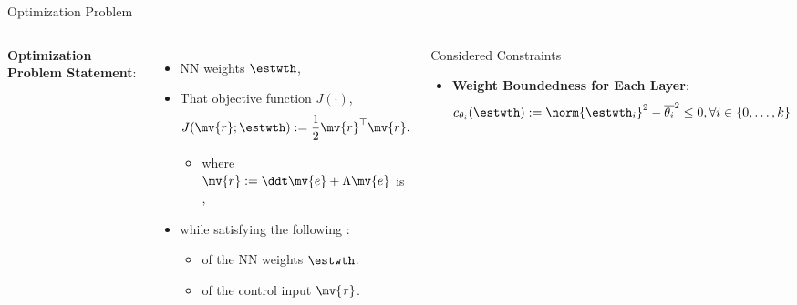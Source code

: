 \documentclass[8pt, aspectratio=169, handout]{beamer}
\newcommand{\ctxt}[2]{\color{#1}{#2}\color{black}}
\begin{document}
\begin{frame}{\insertsubsectionhead}{Optimization Problem}

\begin{columns}


    \textbf{Optimization Problem Statement}:

    \begin{itemize}
      \item \ctxt{awesome}{Find } NN weights $\estwth$,
      \item That \ctxt{airforceblue}{minimize } objective function $J(\cdot)$,
        \begin{equation}\label{eq:obj}
          J(\mv{r};\estwth)
          := 
          \frac{1}{2} \mv{r}^\top \mv{r}.
        \end{equation}
        \begin{itemize}
          \item where $\mv{r} := \ddt\mv{e} + \Lambda\mv{e}$ is \ctxt{awesome}{filtered tracking error},
        \end{itemize}
      \item while satisfying the following \ctxt{awesome}{constraints}:
        \begin{itemize}
          \item \ctxt{airforceblue}{Boundedness } of the NN weights $\estwth$.
          \item \ctxt{airforceblue}{Saturation } of the control input $\mv{\tau}$.
        \end{itemize}
    \end{itemize}

  

  {
    \begin{block}{Considered Constraints}

      \begin{itemize}
        \item \textbf{Weight Boundedness for Each Layer}: 
          \begin{equation}\label{eq:cstr:weight}
            c_{\theta_i}(\estwth)
            :=
            \norm{\estwth_i}^2 - \overline{\theta_i}^2 \le 0
            , 
            \forall i\in\{0,\ldots,k\}
          \end{equation}


\end{itemize}
\end{block}}
\end{columns}
\end{frame}
\end{document}
